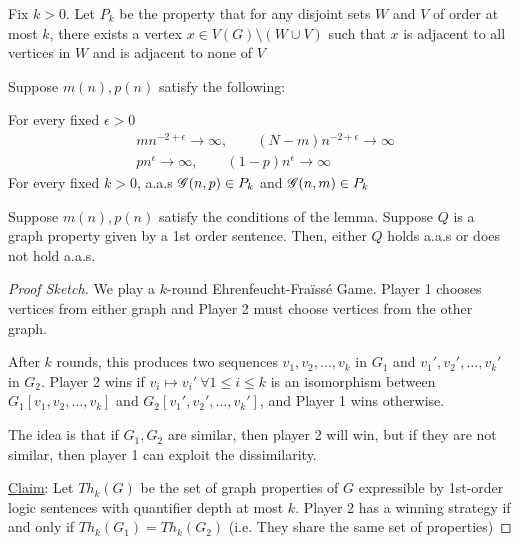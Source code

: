 Fix $k > 0$.
Let $P_k$ be the property that for any disjoint sets $W$ and $V$ of order at most $k$, there exists a vertex $x \in V(G) \setminus (W \cup V)$ such that $x$ is adjacent to all vertices in $W$ and is adjacent to none of $V$

\begin{lemma}
    Suppose $m(n), p(n)$ satisfy the following:

    For every fixed $\epsilon > 0$
    \begin{align*}
        &mn^{-2 + \epsilon} \rightarrow \infty, \qquad (N - m)n^{-2 + \epsilon} \rightarrow \infty \\
        &pn^\epsilon \rightarrow \infty, \qquad (1-p)n^\epsilon \rightarrow \infty
    \end{align*}
    For every fixed $k > 0$, a.a.s $\operatorname{\mathscr{G}}(n, p) \in P_k$ and $\operatorname{\mathscr{G}}(n, m) \in P_k$
\end{lemma}

\begin{theorem}
    Suppose $m(n), p(n)$ satisfy the conditions of the lemma.
    Suppose $Q$ is a graph property given by a 1st order sentence.
    Then, either $Q$ holds a.a.s or does not hold a.a.s.
\end{theorem}
\begin{proof}[Proof Sketch]
    We play a $k$-round Ehrenfeucht-Fra\"{i}ss\'{e} Game.
    Player 1 chooses vertices from either graph and Player 2 must choose vertices from the other graph.
    
    After $k$ rounds, this produces two sequences $v_1, v_2, \ldots, v_k$ in $G_1$ and $v_1', v_2', \ldots, v_k'$ in $G_2$.
    Player 2 wins if $v_i \mapsto v_i' \ \forall 1 \leq i \leq k$ is an isomorphism between $G_1[v_1, v_2, \ldots, v_k]$ and $G_2[v_1', v_2', \ldots, v_k']$, and Player 1 wins otherwise.

    The idea is that if $G_1, G_2$ are similar, then player 2 will win, but if they are not similar, then player 1 can exploit the dissimilarity. 
    
    \ul{Claim}: Let $Th_k(G)$ be the set of graph properties of $G$ expressible by 1st-order logic sentences with quantifier depth at most $k$.
    Player 2 has a winning strategy if and only if $Th_k(G_1) = Th_k(G_2)$ (i.e. They share the same set of properties)
\end{proof}